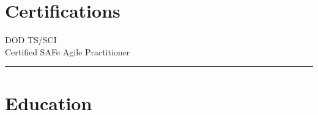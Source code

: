 \documentclass[letterpaper]{deedy-resume}
\begin{document}
\begin{minipage}[t]{0.3\textwidth}


\section{Certifications}

\vspace{1em}

\textbullet{} DOD TS/SCI\\
\textbullet{} Certified SAFe\textregistered{} Agile Practitioner\\
\sectionspace
\vspace{-1ex}
\rule{5cm}{0.5pt}


\vspace{2em}
\section{Education}
\vspace{1em}

\vspace{0.5em}



\end{minipage}
\end{document}
